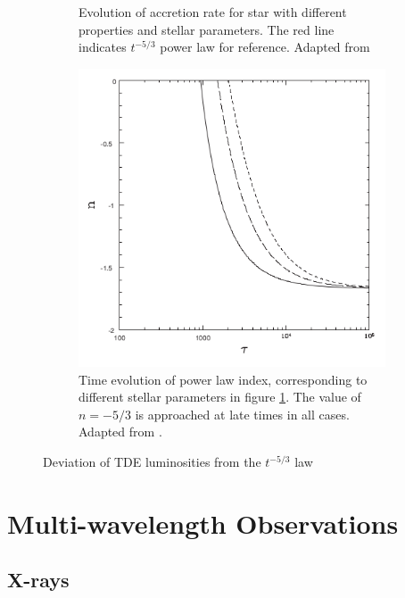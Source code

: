 \documentclass{tda}
\begin{document}
\begin{figure}
\begin{subfigure} {.33\linewidth}
		\caption{Evolution of accretion rate for star with different properties and stellar parameters. The red line indicates \(t^{-5/3}\) power law for reference. Adapted from \cite{lodato_stellar_2009}}
		\label{fig:lodato2009a}
	\end{subfigure}
	\begin{subfigure} {.33\linewidth}
		\centering
		\captionsetup{width=.85\linewidth}
		\includegraphics[width=\textwidth]{./images/lodato2009b.png}
		\caption{Time evolution of power law index, corresponding to different stellar parameters in figure \ref{fig:lodato2009a}. The value of \(n=-5/3\) is approached at late times in all cases. Adapted from \cite{lodato_stellar_2009}.}
		\label{fig:lodato2009b}
	\end{subfigure}
	\caption{Deviation of TDE luminosities from the \(t^{-5/3}\) law}
\end{figure}

\section{Multi-wavelength Observations} \label{multiwavelength_astro}


\subsection{X-rays} \label{multiwave:xrays}
\end{document}
